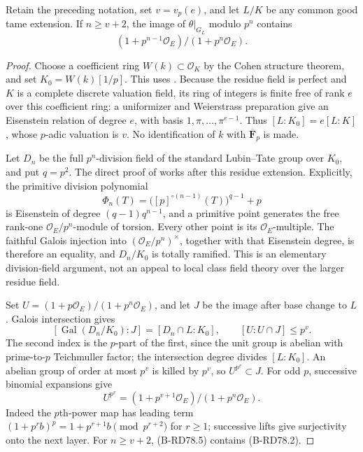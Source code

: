 \begin{lemma}
\label{lem:B-RD78-layer}
Retain the preceding notation, set \(v=v_p(e)\), and let
\(L/K\) be any common good tame extension. If \(n\ge v+2\),
the image of \(\theta|_{G_L}\) modulo \(p^n\) contains
\[
          (1+p^{n-1}\mathcal O_E)/(1+p^n\mathcal O_E).
                                                        \tag{B-RD78.2}
\]
\end{lemma}
\begin{proof}
Choose a coefficient ring \(W(k)\subset\mathcal O_K\)
by the Cohen structure theorem, and set \(K_0=W(k)[1/p]\).
This uses \cite[Theorem~10.160.8, Tag~032A]{Stacks032A}.
Because the residue field is perfect and \(K\) is a complete
discrete valuation field, its ring of integers is finite free
of rank \(e\) over this coefficient ring: a uniformizer and
Weierstrass preparation give an Eisenstein relation of degree
\(e\), with basis \(1,\pi,\ldots,\pi^{e-1}\).
Thus \([L:K_0]=e[L:K]\), whose \(p\)-adic valuation is \(v\).
No identification of \(k\) with \(\overline{\mathbf F}_p\)
is made.

Let \(D_n\) be the full \(p^n\)-division field of the standard
Lubin--Tate group over \(K_0\), and put \(q=p^2\).
The direct proof of
\cite[Theorem~2(b),(d),(e) and complete proof, pp.~383--384]
{LubinTate1965FormalCM} works after this residue extension.
Explicitly, the primitive division polynomial
\[
 \Phi_n(T)=\bigl([p]^{\circ(n-1)}(T)\bigr)^{q-1}+p
                                                        \tag{B-RD78.3}
\]
is Eisenstein of degree \((q-1)q^{n-1}\), and a primitive
point generates the free rank-one \(\mathcal O_E/p^n\)-module
of torsion. Every other point is its \(\mathcal O_E\)-multiple.
The faithful Galois injection into
\((\mathcal O_E/p^n)^\times\), together with that Eisenstein
degree, is therefore an equality, and \(D_n/K_0\) is totally
ramified. This is an elementary division-field argument, not
an appeal to local class field theory over the larger residue
field.

Set \(U=(1+p\mathcal O_E)/(1+p^n\mathcal O_E)\), and let
\(J\) be the image after base change to \(L\). Galois
intersection gives
\[
 [\operatorname{Gal}(D_n/K_0):J]=[D_n\cap L:K_0],
 \qquad [U:U\cap J]\le p^v.                         \tag{B-RD78.4}
\]
The second index is the \(p\)-part of the first, since the
unit group is abelian with prime-to-\(p\) Teichmuller factor;
the intersection degree divides \([L:K_0]\).
An abelian group of order at most \(p^v\) is killed by \(p^v\),
so \(U^{p^v}\subset J\). For odd \(p\), successive binomial
expansions give
\[
 U^{p^v}=(1+p^{v+1}\mathcal O_E)/(1+p^n\mathcal O_E).
                                                        \tag{B-RD78.5}
\]
Indeed the \(p\)th-power map has leading term
\((1+p^r b)^p=1+p^{r+1}b\pmod{p^{r+2}}\) for \(r\ge1\);
successive lifts give surjectivity onto the next layer.
For \(n\ge v+2\), (B-RD78.5) contains (B-RD78.2).
\end{proof}

